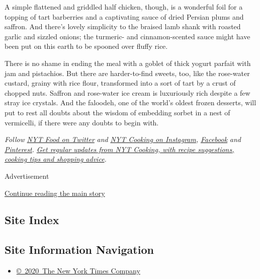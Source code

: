 A simple flattened and griddled half chicken, though, is a wonderful
foil for a topping of tart barberries and a captivating sauce of dried
Persian plums and saffron. And there's lovely simplicity to the braised
lamb shank with roasted garlic and sizzled onions; the turmeric- and
cinnamon-scented sauce might have been put on this earth to be spooned
over fluffy rice.

There is no shame in ending the meal with a goblet of thick yogurt
parfait with jam and pistachios. But there are harder-to-find sweets,
too, like the rose-water custard, grainy with rice flour, transformed
into a sort of tart by a crust of chopped nuts. Saffron and rose-water
ice cream is luxuriously rich despite a few stray ice crystals. And the
faloodeh, one of the world's oldest frozen desserts, will put to rest
all doubts about the wisdom of embedding sorbet in a nest of vermicelli,
if there were any doubts to begin with.

\emph{Follow} \emph{\href{https://twitter.com/nytfood}{NYT Food on
Twitter}} \emph{and}
\emph{\href{https://www.instagram.com/nytcooking/}{NYT Cooking on
Instagram},}
\emph{\href{https://www.facebookcorewwwi.onion/nytcooking/}{Facebook}}
\emph{and}
\emph{\href{https://www.pinterest.com/nytcooking/}{Pinterest}.}
\emph{\href{https://www.nytimes3xbfgragh.onion/newsletters/cooking}{Get
regular updates from NYT Cooking, with recipe suggestions, cooking tips
and shopping advice}.}

Advertisement

\protect\hyperlink{after-bottom}{Continue reading the main story}

\hypertarget{site-index}{%
\subsection{Site Index}\label{site-index}}

\hypertarget{site-information-navigation}{%
\subsection{Site Information
Navigation}\label{site-information-navigation}}

\begin{itemize}
\tightlist
\item
  \href{https://help.nytimes3xbfgragh.onion/hc/en-us/articles/115014792127-Copyright-notice}{©~2020~The
  New York Times Company}
\end{itemize}


